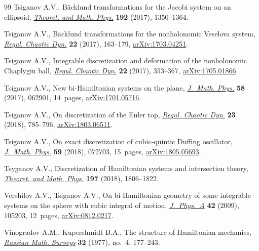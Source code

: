 \documentclass[pdftex]{sigma}
\numberwithin{equation}{section}
\begin{document}
\begin{thebibliography}{99}
Tsiganov A.V., B\"acklund transformations for the {J}acobi system on an
  ellipsoid, \href{https://doi.org/10.1134/S0040577917090069}{\textit{Theoret. and Math. Phys.}} \textbf{192} (2017), 1350--1364.

Tsiganov A.V., B\"acklund transformations for the nonholonomic {V}eselova
  system, \href{https://doi.org/10.1134/S1560354717020058}{\textit{Regul. Chaotic Dyn.}} \textbf{22} (2017), 163--179,
  \href{https://arxiv.org/abs/1703.04251}{arXiv:1703.04251}.

Tsiganov A.V., Integrable discretization and deformation of the nonholonomic
  {C}haplygin ball, \href{https://doi.org/10.1134/S1560354717040025}{\textit{Regul. Chaotic Dyn.}} \textbf{22} (2017), 353--367,
  \href{https://arxiv.org/abs/1705.01866}{arXiv:1705.01866}.

Tsiganov A.V., New bi-{H}amiltonian systems on the plane, \href{https://doi.org/10.1063/1.4989534}{\textit{J.~Math.
  Phys.}} \textbf{58} (2017), 062901, 14~pages, \href{https://arxiv.org/abs/1701.05716}{arXiv:1701.05716}.

Tsiganov A.V., On discretization of the {E}uler top, \href{https://doi.org/10.1134/S1560354718060114}{\textit{Regul. Chaotic
  Dyn.}} \textbf{23} (2018), 785--796, \href{https://arxiv.org/abs/1803.06511}{arXiv:1803.06511}.

Tsiganov A.V., On exact discretization of cubic-quintic {D}uffing oscillator,
  \href{https://doi.org/10.1063/1.5034381}{\textit{J.~Math. Phys.}} \textbf{59} (2018), 072703, 15~pages,
  \href{https://arxiv.org/abs/1805.05693}{arXiv:1805.05693}.

Tsyganov A.V., Discretization of Hamiltonian systems and intersection theory,
  \href{https://doi.org/10.1134/S0040577918120103}{\textit{Theoret. and Math. Phys.}} \textbf{197} (2018), 1806--1822.

Vershilov A.V., Tsiganov A.V., On bi-{H}amiltonian geometry of some integrable
  systems on the sphere with cubic integral of motion, \href{https://doi.org/10.1088/1751-8113/42/10/105203}{\textit{J.~Phys.~A}}
  \textbf{42} (2009), 105203, 12~pages, \href{https://arxiv.org/abs/0812.0217}{arXiv:0812.0217}.

Vinogradov A.M., Kupershmidt B.A., The structure of {H}amiltonian mechanics,
  \href{https://doi.org/10.1070/RM1977v032n04ABEH001642}{\textit{Russian Math. Surveys}} \textbf{32} (1977), no.~4, 177--243.

\end{thebibliography}\LastPageEnding
\end{document}
